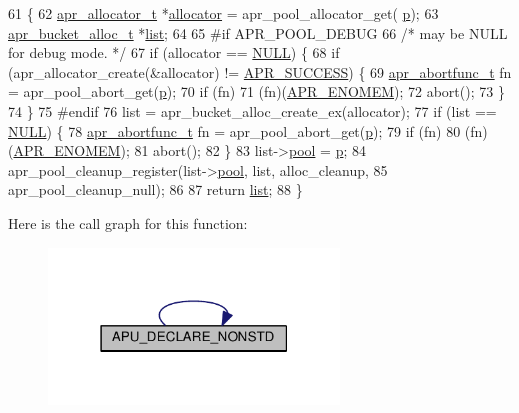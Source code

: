 \begin{DoxyCode}
61 \{
62     \hyperlink{structapr__allocator__t}{apr\_allocator\_t} *\hyperlink{group__apr__pools_ga3d4c7b6ba19a3b46b6fecdee3d867787}{allocator} = apr\_pool\_allocator\_get(
      \hyperlink{group__APACHE__CORE__MPM_ga5cd91701e5c167f2b1a38e70ab57817e}{p});
63     \hyperlink{structapr__bucket__alloc__t}{apr\_bucket\_alloc\_t} *\hyperlink{group__APACHE__CORE__PROTO_gaeb6b944e4524f915483b5696b7f2f424}{list};
64 
65 \textcolor{preprocessor}{#if APR\_POOL\_DEBUG}
66     \textcolor{comment}{/* may be NULL for debug mode. */}
67     \textcolor{keywordflow}{if} (allocator == \hyperlink{pcre_8txt_ad7f989d16aa8ca809a36bc392c07fba1}{NULL}) \{
68         \textcolor{keywordflow}{if} (apr\_allocator\_create(&allocator) != \hyperlink{group__apr__errno_ga9ee311b7bf1c691dc521d721339ee2a6}{APR\_SUCCESS}) \{
69             \hyperlink{group__apr__pools_ga370a939349adf6d1438068e2fc69a0dd}{apr\_abortfunc\_t} fn = apr\_pool\_abort\_get(\hyperlink{group__APACHE__CORE__MPM_ga5cd91701e5c167f2b1a38e70ab57817e}{p});
70             \textcolor{keywordflow}{if} (fn)
71                 (fn)(\hyperlink{group__APR__Error_ga6a453e60000000609a95817efabebf4f}{APR\_ENOMEM});
72             abort();
73         \}
74     \}
75 \textcolor{preprocessor}{#endif}
76     list = apr\_bucket\_alloc\_create\_ex(allocator);
77     \textcolor{keywordflow}{if} (list == \hyperlink{pcre_8txt_ad7f989d16aa8ca809a36bc392c07fba1}{NULL}) \{
78             \hyperlink{group__apr__pools_ga370a939349adf6d1438068e2fc69a0dd}{apr\_abortfunc\_t} fn = apr\_pool\_abort\_get(\hyperlink{group__APACHE__CORE__MPM_ga5cd91701e5c167f2b1a38e70ab57817e}{p});
79             \textcolor{keywordflow}{if} (fn)
80                 (fn)(\hyperlink{group__APR__Error_ga6a453e60000000609a95817efabebf4f}{APR\_ENOMEM});
81             abort();
82     \}
83     list->\hyperlink{structapr__bucket__alloc__t_a5b0c350e0a447b0d11f7791a2fa4ca18}{pool} = \hyperlink{group__APACHE__CORE__MPM_ga5cd91701e5c167f2b1a38e70ab57817e}{p};
84     apr\_pool\_cleanup\_register(list->\hyperlink{structapr__bucket__alloc__t_a5b0c350e0a447b0d11f7791a2fa4ca18}{pool}, list, alloc\_cleanup,
85                               apr\_pool\_cleanup\_null);
86 
87     \textcolor{keywordflow}{return} \hyperlink{group__APACHE__CORE__PROTO_gaeb6b944e4524f915483b5696b7f2f424}{list};
88 \}
\end{DoxyCode}


Here is the call graph for this function\+:
\nopagebreak
\begin{figure}[H]
\begin{center}
\leavevmode
\includegraphics[width=219pt]{group__APR__Util__Bucket__Brigades_ga555f01b5d309441a9d8a96e8dbaa470f_cgraph}
\end{center}
\end{figure}





